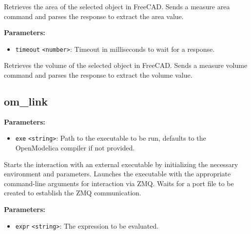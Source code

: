\documentclass[12pt,a4paper]{article}
\begin{document}
\noindent Retrieves the area of the selected object in FreeCAD.
Sends a measure area command and parses the response to extract the area value.

\vspace{5mm}
\noindent {}


\noindent \textbf{Parameters:}
\begin{itemize}
  \item \texttt{timeout} \texttt{<number>}: Timeout in milliseconds to wait for a response.
\end{itemize}

\noindent Retrieves the volume of the selected object in FreeCAD.
Sends a measure volume command and parses the response to extract the volume value.


\subsection{om\_link}
\vspace{5mm}
\noindent {}


\noindent \textbf{Parameters:}
\begin{itemize}
  \item \texttt{exe} \texttt{<string>}: Path to the executable to be run, defaults to the OpenModelica compiler if not provided.
\end{itemize}

\noindent Starts the interaction with an external executable by initializing the necessary environment and parameters.
Launches the executable with the appropriate command-line arguments for interaction via ZMQ.
Waits for a port file to be created to establish the ZMQ communication.

\vspace{5mm}
\noindent {}


\noindent \textbf{Parameters:}
\begin{itemize}
  \item \texttt{expr} \texttt{<string>}: The expression to be evaluated.
\end{itemize}
\end{document}
